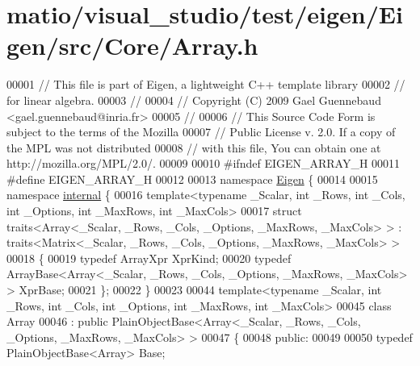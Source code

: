 \hypertarget{matio_2visual__studio_2test_2eigen_2_eigen_2src_2_core_2_array_8h_source}{}\section{matio/visual\+\_\+studio/test/eigen/\+Eigen/src/\+Core/\+Array.h}
\label{matio_2visual__studio_2test_2eigen_2_eigen_2src_2_core_2_array_8h_source}

\begin{DoxyCode}
00001 \textcolor{comment}{// This file is part of Eigen, a lightweight C++ template library}
00002 \textcolor{comment}{// for linear algebra.}
00003 \textcolor{comment}{//}
00004 \textcolor{comment}{// Copyright (C) 2009 Gael Guennebaud <gael.guennebaud@inria.fr>}
00005 \textcolor{comment}{//}
00006 \textcolor{comment}{// This Source Code Form is subject to the terms of the Mozilla}
00007 \textcolor{comment}{// Public License v. 2.0. If a copy of the MPL was not distributed}
00008 \textcolor{comment}{// with this file, You can obtain one at http://mozilla.org/MPL/2.0/.}
00009 
00010 \textcolor{preprocessor}{#ifndef EIGEN\_ARRAY\_H}
00011 \textcolor{preprocessor}{#define EIGEN\_ARRAY\_H}
00012 
00013 \textcolor{keyword}{namespace }\hyperlink{namespace_eigen}{Eigen} \{
00014 
00015 \textcolor{keyword}{namespace }\hyperlink{namespaceinternal}{internal} \{
00016 \textcolor{keyword}{template}<\textcolor{keyword}{typename} \_Scalar, \textcolor{keywordtype}{int} \_Rows, \textcolor{keywordtype}{int} \_Cols, \textcolor{keywordtype}{int} \_Options, \textcolor{keywordtype}{int} \_MaxRows, \textcolor{keywordtype}{int} \_MaxCols>
00017 \textcolor{keyword}{struct }traits<Array<\_Scalar, \_Rows, \_Cols, \_Options, \_MaxRows, \_MaxCols> > : traits<Matrix<\_Scalar, \_Rows, 
      \_Cols, \_Options, \_MaxRows, \_MaxCols> >
00018 \{
00019   \textcolor{keyword}{typedef} ArrayXpr XprKind;
00020   \textcolor{keyword}{typedef} ArrayBase<Array<\_Scalar, \_Rows, \_Cols, \_Options, \_MaxRows, \_MaxCols> > XprBase;
00021 \};
00022 \}
00023 
00044 \textcolor{keyword}{template}<\textcolor{keyword}{typename} \_Scalar, \textcolor{keywordtype}{int} \_Rows, \textcolor{keywordtype}{int} \_Cols, \textcolor{keywordtype}{int} \_Options, \textcolor{keywordtype}{int} \_MaxRows, \textcolor{keywordtype}{int} \_MaxCols>
00045 \textcolor{keyword}{class }Array
00046   : \textcolor{keyword}{public} PlainObjectBase<Array<\_Scalar, \_Rows, \_Cols, \_Options, \_MaxRows, \_MaxCols> >
00047 \{
00048   \textcolor{keyword}{public}:
00049 
00050     \textcolor{keyword}{typedef} PlainObjectBase<Array> Base;

\end{DoxyCode}
